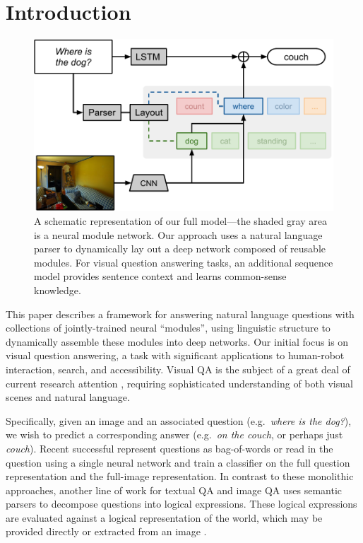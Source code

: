 \section{Introduction} 

\begin{figure}[t] \begin{center}
    \includegraphics[width=\linewidth]{fig/teaser} \end{center} \caption{
      A schematic representation of our full model---the shaded gray area is a
      neural module network. Our approach uses a natural language parser to
      dynamically lay out a deep network composed of reusable modules. For
      visual question answering tasks, an additional sequence model provides
      sentence context and learns common-sense knowledge.
    } \label{fig:teaser}
\end{figure}

This paper describes a framework for answering natural language questions with
collections of jointly-trained neural ``modules'', using linguistic structure to
dynamically assemble these modules into deep networks. Our initial focus is on
visual question answering, a task with significant applications to human-robot
interaction, search, and accessibility. Visual QA is the subject of a great deal
of current research attention 
\cite{antol15iccv,gao2015you,ma15arxiv,malinowski15iccv,ren2015image,yu15arxiv}, 
requiring sophisticated understanding of both visual scenes and natural
language.

Specifically, given an image and an associated question (e.g.\ \emph{where is
the dog?}), we wish to predict a corresponding answer (e.g.\ \emph{on the couch},
or perhaps just \emph{couch}). Recent successful represent questions as
bag-of-words \cite{} or read in the question using a single neural network
\cite{malinowski15iccv}\cite{} and train a classifier on the full question
representation and the full-image representation. In contrast to these
monolithic approaches, another line of work for textual QA \cite{Liang13DCS} and
image QA \cite{malinowski14nips} uses semantic parsers to decompose questions
into logical expressions. These logical expressions are evaluated against a
logical representation of the world, which may be provided directly or extracted
from an image \cite{Krish2013Grounded}.

